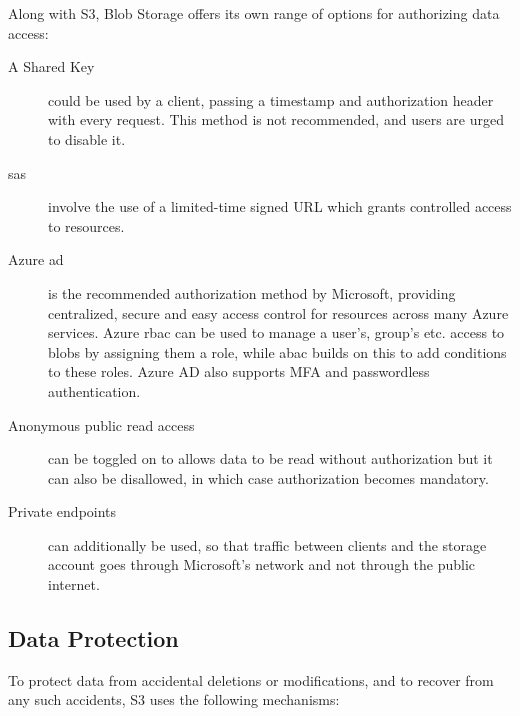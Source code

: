 Along with S3, Blob Storage offers its own range of options for authorizing data access: ~\cite{blob_authorization,blob_endpoint}

\begin{description}
    \item[A Shared Key] could be used by a client, passing a timestamp and authorization header with every request. This method is not recommended, and users are urged to disable it.

    \item[\ac{sas}] involve the use of a limited-time signed URL which grants controlled access to resources.

    \item[Azure \ac{ad}] is the recommended authorization method by Microsoft, providing centralized, secure and easy access control for resources across many Azure services. Azure \ac{rbac} can be used to manage a user's, group's etc. access to blobs by assigning them a role, while \ac{abac} builds on this to add conditions to these roles. Azure AD also supports MFA and passwordless authentication.

    \item[Anonymous public read access] can be toggled on to allows data to be read without authorization but it can also be disallowed, in which case authorization becomes mandatory.

    \item[Private endpoints] can additionally be used, so that traffic between clients and the storage account goes through Microsoft's network and not through the public internet.
\end{description}


\subsection{Data Protection}
To protect data from accidental deletions or modifications, and to recover from any such accidents, S3 uses the following mechanisms: ~\cite{s3faq}


